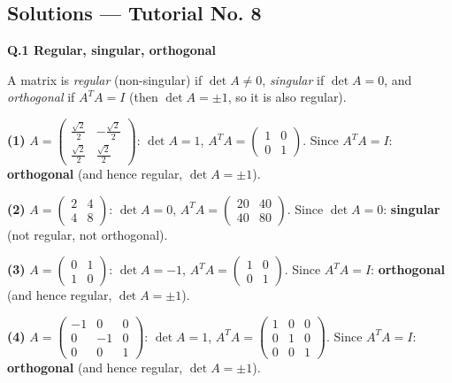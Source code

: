 \subsection*{Solutions --- Tutorial No. 8}
\medskip\noindent\textbf{Q.1  Regular, singular, orthogonal}\par\smallskip
A matrix is \emph{regular} (non-singular) if $\det A\neq0$, \emph{singular} if $\det A=0$, and \emph{orthogonal} if $A^TA=I$ (then $\det A=\pm1$, so it is also regular).

\noindent\textbf{(1)} $A=\begin{pmatrix}\frac{\sqrt{2}}{2} & - \frac{\sqrt{2}}{2} \\ \frac{\sqrt{2}}{2} & \frac{\sqrt{2}}{2}\end{pmatrix}$: $\det A=1$, $A^TA=\begin{pmatrix}1 & 0 \\ 0 & 1\end{pmatrix}$. Since $A^TA=I$: \textbf{orthogonal} (and hence regular, $\det A=\pm1$).


\noindent\textbf{(2)} $A=\begin{pmatrix}2 & 4 \\ 4 & 8\end{pmatrix}$: $\det A=0$, $A^TA=\begin{pmatrix}20 & 40 \\ 40 & 80\end{pmatrix}$. Since $\det A=0$: \textbf{singular} (not regular, not orthogonal).


\noindent\textbf{(3)} $A=\begin{pmatrix}0 & 1 \\ 1 & 0\end{pmatrix}$: $\det A=-1$, $A^TA=\begin{pmatrix}1 & 0 \\ 0 & 1\end{pmatrix}$. Since $A^TA=I$: \textbf{orthogonal} (and hence regular, $\det A=\pm1$).


\noindent\textbf{(4)} $A=\begin{pmatrix}-1 & 0 & 0 \\ 0 & -1 & 0 \\ 0 & 0 & 1\end{pmatrix}$: $\det A=1$, $A^TA=\begin{pmatrix}1 & 0 & 0 \\ 0 & 1 & 0 \\ 0 & 0 & 1\end{pmatrix}$. Since $A^TA=I$: \textbf{orthogonal} (and hence regular, $\det A=\pm1$).


